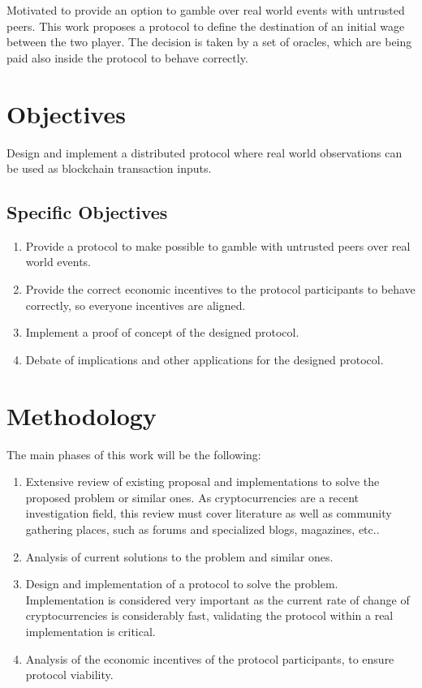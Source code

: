 Motivated to provide an option to gamble over real world events with untrusted
 peers. This work proposes a protocol to define the destination of an initial
 wage between the two player. The decision is taken by a set of oracles, which
 are being paid also inside the protocol to behave correctly.

\section{Objectives}
Design and implement a distributed protocol where real world observations can
  be used as blockchain transaction inputs.

\subsection{Specific Objectives}
\begin{enumerate}
	\item Provide a protocol to make possible to gamble with untrusted peers over
	  real world events.
	\item Provide the correct economic incentives to the protocol participants to
	  behave correctly, so everyone incentives are aligned.
	\item Implement a proof of concept of the designed protocol.
	\item Debate of implications and other applications for the designed protocol.
\end{enumerate}

\section{Methodology}
The main phases of this work will be the following:
\begin{enumerate}
	\item Extensive review of existing proposal and implementations to solve
	  the proposed problem or similar ones. As cryptocurrencies are a recent
	  investigation field, this review must cover literature as well as
	  community gathering places, such as forums and specialized blogs, magazines,
	  etc..
  \item Analysis of current solutions to the problem and similar ones.
  \item Design and implementation of a protocol to solve the problem.
    Implementation is considered very important as the current rate of change
    of cryptocurrencies is considerably fast, validating the protocol within a
    real implementation is critical.
  \item Analysis of the economic incentives of the protocol participants, to
    ensure protocol viability.
\end{enumerate}
